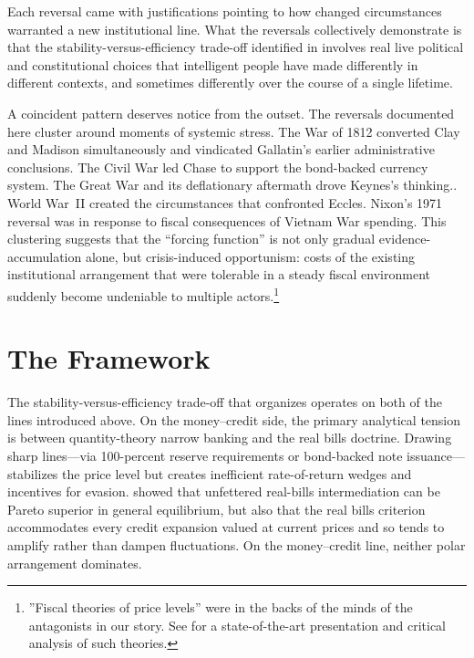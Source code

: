 \documentclass[12pt]{article}
\begin{document}
Each reversal came with justifications pointing to how changed circumstances
warranted a new institutional line.  What the reversals collectively demonstrate is that
the stability-versus-efficiency trade-off identified in
\citet{Sargent2011} involves real
live political and constitutional choices that intelligent people have made differently in different contexts, and sometimes  differently over
the course of a single lifetime.

A coincident pattern deserves notice from the outset.  The
reversals documented here cluster around moments of systemic stress.  The
War of 1812 converted Clay and Madison simultaneously and vindicated
Gallatin's earlier administrative conclusions.  The Civil War  led  Chase to support the bond-backed currency system.  The Great War and its
deflationary aftermath drove Keynes's thinking..  World War~II created
the circumstances that confronted  Eccles.  Nixon's 1971 reversal was in response to  fiscal consequences of Vietnam War spending.  This clustering
suggests that the ``forcing function'' is not only  gradual evidence-accumulation
alone, but crisis-induced opportunism: costs of the existing
institutional arrangement that were tolerable in a steady fiscal
environment suddenly become undeniable to multiple actors.\footnote{''Fiscal theories of price levels'' were in the backs
of the minds of the antagonists in our story. See \citet{Cochrane2023} for a state-of-the-art presentation and critical analysis of such theories.}


\section{The Framework}

The stability-versus-efficiency trade-off that organizes \citet{Sargent2011}
operates on both of the lines introduced above.  On the money--credit side,
the primary analytical tension is between quantity-theory narrow banking and
the real bills doctrine.  Drawing sharp lines---via 100-percent reserve
requirements or bond-backed note issuance---stabilizes the price level but
creates inefficient rate-of-return wedges and incentives for evasion.
\citet{SargentWallace1982} showed that unfettered real-bills intermediation
can be Pareto superior in general equilibrium, but also that the real bills
criterion accommodates every credit expansion valued at current prices and
so tends to amplify rather than dampen fluctuations.  On the money--credit
line, neither polar arrangement dominates.
\end{document}
